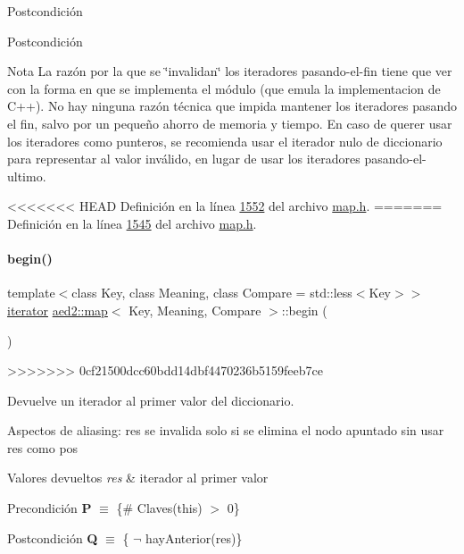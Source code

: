 \begin{DoxyPostcond}{\-Postcondición}
\begin{DoxyPostcond}{\-Postcondición}
\begin{DoxyNote}{Nota}
La razón por la que se \char`\"{}invalidan\char`\"{} los iteradores pasando-\/el-\/fin tiene que ver con la forma en que se implementa el módulo (que emula la implementacion de C++). No hay ninguna razón técnica que impida mantener los iteradores pasando el fin, salvo por un pequeño ahorro de memoria y tiempo. En caso de querer usar los iteradores como punteros, se recomienda usar el iterador nulo de diccionario para representar al valor inválido, en lugar de usar los iteradores pasando-\/el-\/ultimo. 
\end{DoxyNote}


<<<<<<< HEAD
\-Definición en la línea \hyperlink{map_8h_source_l01552}{1552} del archivo \hyperlink{map_8h_source}{map.\-h}.
=======
Definición en la línea \hyperlink{map_8h_source_l01545}{1545} del archivo \hyperlink{map_8h_source}{map.\+h}.

\mbox{\label{classaed2_1_1map_a58a95705d54b3dda7f775ce5a22225cb_a58a95705d54b3dda7f775ce5a22225cb}} 
\paragraph{\texorpdfstring{begin()}{begin()}\hspace{0.1cm}{\footnotesize\ttfamily [1/2]}}
{\footnotesize\ttfamily template$<$class Key, class Meaning, class Compare = std\+::less$<$\+Key$>$$>$ \\
\hyperlink{classaed2_1_1map_1_1iterator}{iterator} \hyperlink{classaed2_1_1map}{aed2\+::map}$<$ Key, Meaning, Compare $>$\+::begin (\begin{DoxyParamCaption}{ }\end{DoxyParamCaption})\hspace{0.3cm}{\ttfamily [inline]}}
>>>>>>> 0cf21500dcc60bdd14dbf4470236b5159feeb7ce



Devuelve un iterador al primer valor del diccionario. 

\begin{DoxyParagraph}{Aspectos de aliasing\+:}
res se invalida solo si se elimina el nodo apuntado sin usar res como pos
\end{DoxyParagraph}

\begin{DoxyRetVals}{Valores devueltos}
{\em res} & iterador al primer valor\\
\hline
\end{DoxyRetVals}
\begin{DoxyPrecond}{Precondición}
{\bfseries P} $\equiv$ \{\# Claves(this) $>$ 0\} 
\end{DoxyPrecond}
\begin{DoxyPostcond}{Postcondición}
{\bfseries Q} $\equiv$ \{ $\lnot$ hay\+Anterior(res)\}
\end{DoxyPostcond}


\end{DoxyPostcond}
\end{DoxyPostcond}

